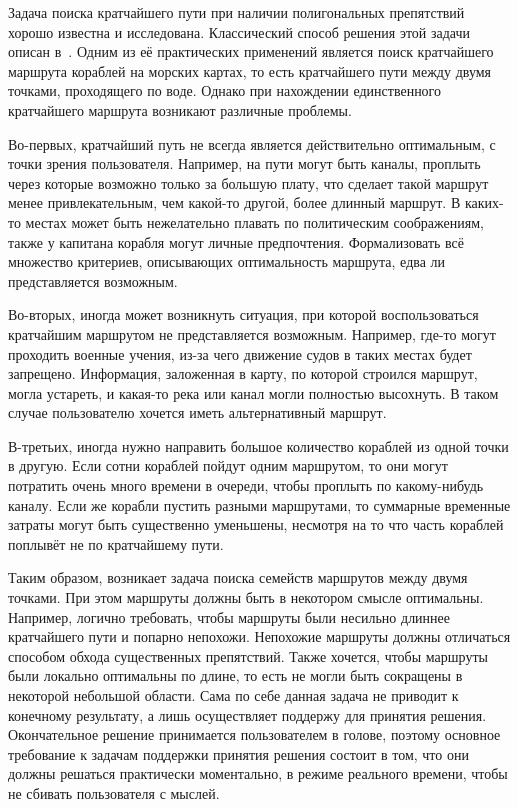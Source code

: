 \startprefacepage

Задача поиска кратчайшего пути при наличии полигональных препятствий
хорошо известна и исследована. Классический способ решения этой задачи
описан в~\cite{de2000computational}. Одним из её практических
применений является поиск кратчайшего маршрута кораблей на морских
картах, то есть кратчайшего пути между двумя точками, проходящего по
воде. Однако при нахождении единственного кратчайшего маршрута
возникают различные проблемы.

Во-первых, кратчайший путь не всегда является действительно
оптимальным, с точки зрения пользователя. Например, на пути могут быть
каналы, проплыть через которые возможно только за большую плату, что
сделает такой маршрут менее привлекательным, чем какой-то другой,
более длинный маршрут. В каких-то местах может быть нежелательно
плавать по политическим соображениям, также у капитана корабля могут
личные предпочтения. Формализовать всё множество критериев,
описывающих оптимальность маршрута, едва ли представляется возможным.

Во-вторых, иногда может возникнуть ситуация, при которой
воспользоваться кратчайшим маршрутом не представляется возможным.
Например, где-то могут проходить военные учения, из-за чего движение
судов в таких местах будет запрещено. Информация, заложенная в карту,
по которой строился маршрут, могла устареть, и какая-то река или канал
могли полностью высохнуть. В таком случае пользователю хочется иметь
альтернативный маршрут.

В-третьих, иногда нужно направить большое количество кораблей из одной
точки в другую. Если сотни кораблей пойдут одним маршрутом, то они
могут потратить очень много времени в очереди, чтобы проплыть по
какому-нибудь каналу. Если же корабли пустить разными маршрутами, то
суммарные временные затраты могут быть существенно уменьшены, несмотря
на то что часть кораблей поплывёт не по кратчайшему пути.

Таким образом, возникает задача поиска семейств маршрутов между двумя
точками. При этом маршруты должны быть в некотором смысле оптимальны.
Например, логично требовать, чтобы маршруты были несильно длиннее
кратчайшего пути и попарно непохожи. Непохожие маршруты должны
отличаться способом обхода существенных препятствий. Также хочется,
чтобы маршруты были локально оптимальны по длине, то есть не могли
быть сокращены в некоторой небольшой области. Сама по себе данная
задача не приводит к конечному результату, а лишь осуществляет
поддержу для принятия решения. Окончательное решение принимается
пользователем в голове, поэтому основное требование к задачам
поддержки принятия решения состоит в том, что они должны решаться
практически моментально, в режиме реального времени, чтобы не сбивать
пользователя с мыслей.

